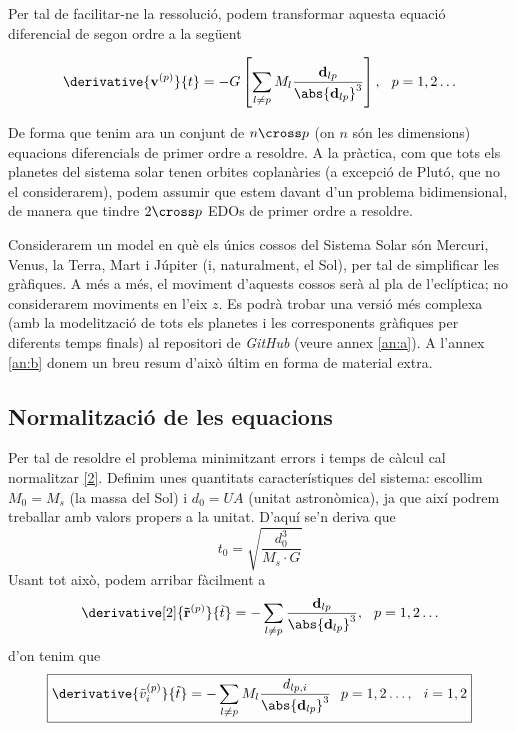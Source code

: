 \documentclass[10pt, twoside, a4paper]{article}
\begin{document}
Per tal de facilitar-ne la ressolució, podem transformar aquesta equació diferencial de segon ordre a la següent

\begin{equation}
    \derivative{\mathbf{v}^{(p)}}{t} = -G \left[ \sum_{l \neq p} M_l\frac{\mathbf{d}_{lp}}{\abs{\mathbf{d}_{lp}}^3}\right], \hspace{0.25cm} p = 1,2 \ldots \label{2}
\end{equation}

De forma que tenim ara un conjunt de $n \cross p$ (on $n$ són les dimensions) equacions diferencials de primer ordre a resoldre. A la pràctica, com que tots els planetes del sistema solar tenen orbites coplanàries (a excepció de Plutó, que no el considerarem), podem assumir que estem davant d'un problema bidimensional, de manera que tindre $2 \cross p$ EDOs de primer ordre a resoldre.

Considerarem un model en què els únics cossos del Sistema Solar són Mercuri, Venus, la Terra, Mart i Júpiter (i, naturalment, el Sol), per tal de simplificar les gràfiques. A més a més, el moviment d'aquests cossos serà al pla de l'eclíptica; no considerarem moviments en l'eix $z$. Es podrà trobar una versió més complexa (amb la modelització de tots els planetes i les corresponents gràfiques per diferents temps finals) al repositori de \textit{GitHub} (veure annex \ref{an:a}). A l'annex \ref{an:b} donem un breu resum d'això últim en forma de material extra.

\subsection{Normalització de les equacions}
Per tal de resoldre el problema minimitzant errors i temps de càlcul cal normalitzar \eqref{2}. Definim unes quantitats característiques del sistema: escollim $M_0 = M_s$ (la massa del Sol) i $d_0 = UA$ (unitat astronòmica), ja que així podrem treballar amb valors propers a la unitat. D'aquí se'n deriva que
\begin{equation*}
    t_0 = \sqrt{\frac{d_0^3}{M_s \cdot G}}
\end{equation*}
Usant tot això, podem arribar fàcilment a 
\begin{equation}
    \derivative[2]{\mathbf{\tilde{r}}^{(p)}}{\tilde{t}} = - \sum_{l \neq p} \frac{\mathbf{d}_{lp}}{\abs{\mathbf{d}_{lp}}^3}, \hspace{0.25cm} p = 1,2 \ldots
\end{equation}
d'on tenim que
\begin{equation}
    \boxed{\derivative{\tilde{v}_i^{(p)}}{\tilde{t}} = - \sum_{l \neq p} M_l \frac{d_{lp,i}}{\abs{\mathbf{d}_{lp}}^3} \hspace{0.25cm} p = 1,2 \ldots, \hspace{0.25cm} i = 1, 2} \label{eq5}
\end{equation}
\end{document}
